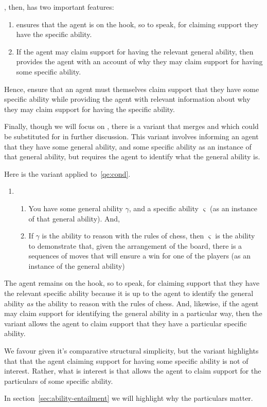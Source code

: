 \begin{note}
  \gsi{}, then, has two important features:
  \begin{enumerate}
  \item \gsi{} ensures that the agent is on the hook, so to speak, for claiming support they have the specific ability.
  \item If the agent may claim support for having the relevant general ability, then \gsi{} provides the agent with an account of why they may claim support for having some specific ability.
  \end{enumerate}
  Hence, \gsi{} ensure that an agent must themselves claim support that they have some specific ability while providing the agent with relevant information about why they may claim support for having the specific ability.
\end{note}

\begin{note}
  Finally, though we will focus on \gsi{}, there is a variant that merges \gsi{} and \dsi{} which could be substituted for \gsi{} in further discussion.
  This variant involves informing an agent that they have some general ability, and some specific ability as an instance of that general ability, but requires the agent to identify what the general ability is.

  Here is the variant applied to~\ref{qe:cond}.
  \begin{enumerate}[label=(\gsi{}\(^{'}\):\arabic*), ref=(\gsi{}\(^{'}\):\arabic*)]
  \item
    \begin{enumerate}
    \item You have some general ability \(\gamma\), and a specific ability \(\varsigma\) (as an instance of that general ability). And,
    \item If \(\gamma\) is the ability to reason with the rules of chess, then \(\varsigma\) is the ability to demonstrate that, given the arrangement of the board, there is a sequences of moves that will ensure a win for one of the players (as an instance of the general ability)
    \end{enumerate}
  \end{enumerate}
  The agent remains on the hook, so to speak, for claiming support that they have the relevant specific ability because it is up to the agent to identify the general ability \emph{as} the ability to reason with the rules of chess.
  And, likewise, if the agent may claim support for identifying the general ability in a particular way, then the variant allows the agent to claim support that they have a particular specific ability.

  We favour \gsi{} given it's comparative structural simplicity, but the variant highlights that that the agent claiming support for having some specific ability is not of interest.
  Rather, what is interest is that \gsi{} allows the agent to claim support for the particulars of some specific ability.

  In section~\ref{sec:ability-entailment} we will highlight why the particulars matter.
\end{note}

